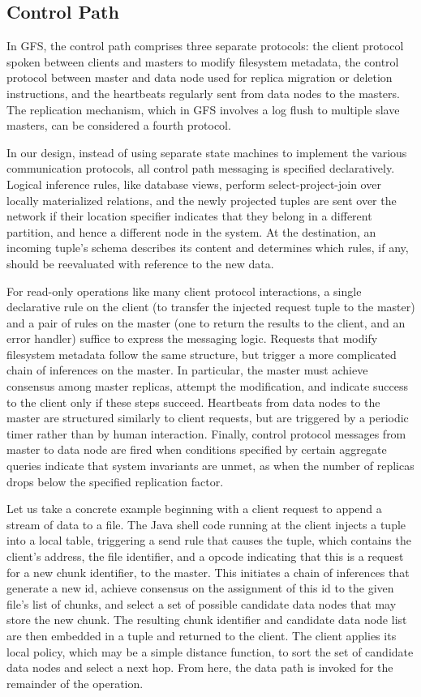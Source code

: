 \documentclass[twocolumn]{article}
\begin{document}
\subsection{Control Path}
\label{control-path}
In GFS, the control path comprises three separate protocols: the
client protocol spoken between clients and masters to modify
filesystem metadata, the control protocol between master and data node
used for replica migration or deletion instructions, and the
heartbeats regularly sent from data nodes to the masters.  The
replication mechanism, which in GFS involves a log flush to multiple
slave masters, can be considered a fourth protocol.

In our design, instead of using separate state machines to implement
the various communication protocols, all control path messaging is
specified declaratively.  Logical inference rules, like database
views, perform select-project-join over locally materialized
relations, and the newly projected tuples are sent over the network if
their location specifier indicates that they belong in a different
partition, and hence a different node in the system.  At the
destination, an incoming tuple's schema describes its content and
determines which rules, if any, should be reevaluated with reference
to the new data.

For read-only operations like many client protocol interactions, a
single declarative rule on the client (to transfer the injected
request tuple to the master) and a pair of rules on the master (one to
return the results to the client, and an error handler) suffice to express the messaging logic.
Requests that modify filesystem metadata follow the same structure,
but trigger a more complicated chain of inferences on the master.  In
particular, the master must achieve consensus among master replicas,
attempt the modification, and indicate success to the client only if
these steps succeed.  Heartbeats from data nodes to the master are
structured similarly to client requests, but are triggered by a
periodic timer rather than by human interaction.  Finally, control
protocol messages from master to data node are fired when conditions
specified by certain aggregate queries indicate that system invariants
are unmet, as when the number of replicas drops below the specified
replication factor.

Let us take a concrete example beginning with a client request to
append a stream of data to a file.  The Java shell code running at the
client injects a tuple into a local table, triggering a send rule that
causes the tuple, which contains the client's address, the file
identifier, and a opcode indicating that this is a request for a new
chunk identifier, to the master.  This initiates a chain of inferences
that generate a new id, achieve consensus on the assignment of this id
to the given file's list of chunks, and select a set of possible
candidate data nodes that may store the new chunk.  The resulting
chunk identifier and candidate data node list are then embedded in a
tuple and returned to the client.  The client applies its local
policy, which may be a simple distance function, to sort the set of
candidate data nodes and select a next hop.  From here, the data path
is invoked for the remainder of the operation.
\end{document}
